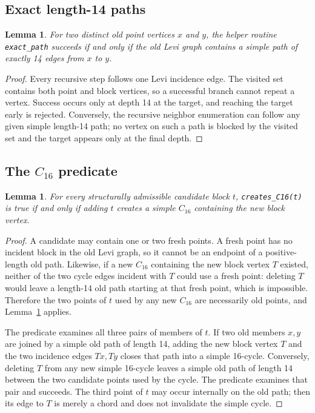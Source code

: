 \documentclass[11pt]{article}
\newtheorem{lemma}[theorem]{Lemma}
\theoremstyle{remark}
\newcommand{\Csixteen}{C_{16}}
\begin{document}
\subsection{Exact length-14 paths}

\begin{lemma}\label{lem:exactpath}
For two distinct old point vertices \(x\) and \(y\), the helper routine \texttt{exact\_path} succeeds if and only if the old Levi graph contains a simple path of exactly 14 edges from \(x\) to \(y\).
\end{lemma}

\begin{proof}
Every recursive step follows one Levi incidence edge.  The visited set contains both point and block vertices, so a successful branch cannot repeat a vertex.  Success occurs only at depth 14 at the target, and reaching the target early is rejected.  Conversely, the recursive neighbor enumeration can follow any given simple length-14 path; no vertex on such a path is blocked by the visited set and the target appears only at the final depth.
\end{proof}

\subsection{The \texorpdfstring{\(C_{16}\)}{C16} predicate}

\begin{lemma}\label{lem:c16}
For every structurally admissible candidate block \(t\), \texttt{creates\_C16(t)} is true if and only if adding \(t\) creates a simple \(\Csixteen\) containing the new block vertex.
\end{lemma}

\begin{proof}
A candidate may contain one or two fresh points.  A fresh point has no incident block in the old Levi graph, so it cannot be an endpoint of a positive-length old path.  Likewise, if a new \(\Csixteen\) containing the new block vertex \(T\) existed, neither of the two cycle edges incident with \(T\) could use a fresh point: deleting \(T\) would leave a length-14 old path starting at that fresh point, which is impossible.  Therefore the two points of \(t\) used by any new \(\Csixteen\) are necessarily old points, and Lemma~\ref{lem:exactpath} applies.

The predicate examines all three pairs of members of \(t\).  If two old members \(x,y\) are joined by a simple old path of length 14, adding the new block vertex \(T\) and the two incidence edges \(Tx,Ty\) closes that path into a simple 16-cycle.  Conversely, deleting \(T\) from any new simple 16-cycle leaves a simple old path of length 14 between the two candidate points used by the cycle.  The predicate examines that pair and succeeds.  The third point of \(t\) may occur internally on the old path; then its edge to \(T\) is merely a chord and does not invalidate the simple cycle.
\end{proof}
\end{document}
